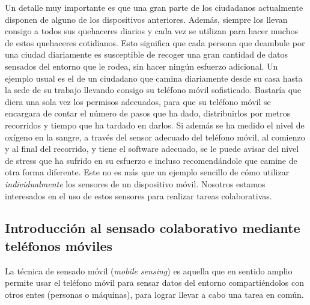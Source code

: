 Un detalle muy importante es que una gran parte de los ciudadanos actualmente disponen de alguno de los dispositivos anteriores. Además, siempre los llevan consigo a todos sus quehaceres diarios y cada vez se utilizan para hacer muchos de estos quehaceres cotidianos. Esto significa que cada persona que deambule por una ciudad diariamente es susceptible de recoger una gran cantidad de datos sensados del entorno que le rodea, sin hacer ningún esfuerzo adicional. Un ejemplo usual es el de un ciudadano que camina diariamente desde su casa hasta la sede de su trabajo llevando consigo su teléfono móvil sofisticado. Bastaría que diera una sola vez los permisos adecuados, para que su teléfono móvil se encargara de contar el número de pasos que ha dado, distribuirlos por metros recorridos y tiempo que ha tardado en darlos. Si además se ha medido el nivel de oxígeno en la sangre, a través del sensor adecuado del teléfono móvil, al comienzo y al final del recorrido, y tiene el software adecuado, se le puede avisar del nivel de stress que ha sufrido en su esfuerzo e incluso recomendándole que camine de otra forma diferente. Este no es más que un ejemplo sencillo de cómo utilizar \emph{individualmente} los sensores de un dispositivo móvil. Nosotros estamos interesados en el uso de estos sensores para realizar tareas colaborativas.

\subsection{Introducción al sensado colaborativo mediante teléfonos móviles}

La técnica de sensado móvil (\emph{mobile sensing}) \cite{MobileSensing} es aquella que en sentido amplio permite usar el teléfono móvil para sensar datos del entorno compartiéndolos con otros entes (personas o máquinas), para lograr llevar a cabo una tarea en común.

